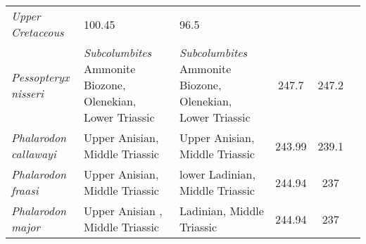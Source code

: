 \begin{longtabu}{>{\itshape}lXXSSl}
        Upper Cretaceous
                                                             & 100.45
                                                             & 96.5
                                                             &
                                                             \cite{Fischer2016P} \\                    
	Pessopteryx nisseri                                  &
        \emph{Subcolumbites} Ammonite Biozone, Olenekian, Lower Triassic
                                                             &
        \emph{Subcolumbites} Ammonite Biozone, Olenekian, Lower Triassic
                                                             & 247.7
                                                             & 247.2
                                                             &
                                                             \cite{Wiman1910BGIU} \\                      
	Phalarodon callawayi                                 & Upper Anisian,
        Middle Triassic
                                                             & Upper Anisian,
        Middle Triassic
                                                             & 243.99
                                                             & 239.1
                                                             &
                                                             \cite{Schmitz2004PAP} \\                    
	Phalarodon fraasi                                    & Upper Anisian,
        Middle Triassic
                                                             & lower Ladinian,
        Middle Triassic
                                                             & 244.94
                                                             & 237
                                                             &
                                                             \cite{Merriam1910UCBDG} \\                    
	Phalarodon major                                     & Upper Anisian ,
        Middle Triassic
                                                             & Ladinian, Middle
        Triassic
                                                             & 244.94
                                                             & 237
                                                             &
                                                             \cite{Maisch2005NJFGPM} \\                     

\end{longtabu}
